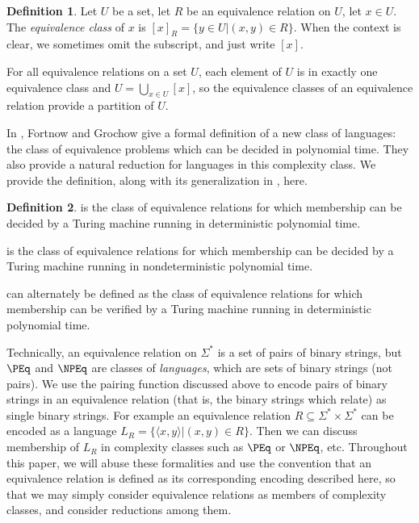 \documentclass{article}
\theoremstyle{definition} \newtheorem{definition}[definition]{Definition}
\newcommand{\sigmastar}{\Sigma^{*}} %
\newcommand{\defn}[1]{\emph{#1}} %
\newcommand{\pair}[2]{\langle#1,#2\rangle} %
\begin{document}
\begin{definition}
  Let $U$ be a set, let $R$ be an equivalence relation on $U$, let $x\in
  U$. The \defn{equivalence class} of $x$ is $[x]_R=\{y\in U|(x,y)\in
  R\}$. When the context is clear, we sometimes omit the subscript, and just
  write $[x]$.
\end{definition}
For all equivalence relations on a set $U$, each element of $U$ is in exactly
one equivalence class and $U=\bigcup_{x\in U}{[x]}$, so the equivalence classes
of an equivalence relation provide a partition of $U$.

In \cite{fg09}, Fortnow and Grochow give a formal definition of a new class of
languages: the class of equivalence problems which can be decided in polynomial
time. They also provide a natural reduction for languages in this complexity
class. We provide the definition, along with its generalization in \NP, here.

\begin{definition}\label{def:peq}
  \defn{\PEq} is the class of equivalence relations for which membership can be
  decided by a Turing machine running in deterministic polynomial time.

  \defn{\NPEq} is the class of equivalence relations for which membership can
  be decided by a Turing machine running in nondeterministic polynomial time.

  \defn{\NPEq} can alternately be defined as the class of equivalence relations
  for which membership can be verified by a Turing machine running in
  deterministic polynomial time.
\end{definition}

Technically, an equivalence relation on $\sigmastar$ is a set of pairs of
binary strings, but $\PEq$ and $\NPEq$ are classes of \emph{languages}, which
are sets of binary strings (not pairs). We use the pairing function discussed
above to encode pairs of binary strings in an equivalence relation (that is,
the binary strings which relate) as single binary strings. For example an
equivalence relation $R\subseteq\sigmastar\times\sigmastar$ can be encoded as a
language $L_R=\{\pair{x}{y}|(x,y)\in R\}$. Then we can discuss membership of
$L_R$ in complexity classes such as $\PEq$ or $\NPEq$, etc. Throughout this
paper, we will abuse these formalities and use the convention that an
equivalence relation is defined as its corresponding encoding described here,
so that we may simply consider equivalence relations as members of complexity
classes, and consider reductions among them.
\end{document}
